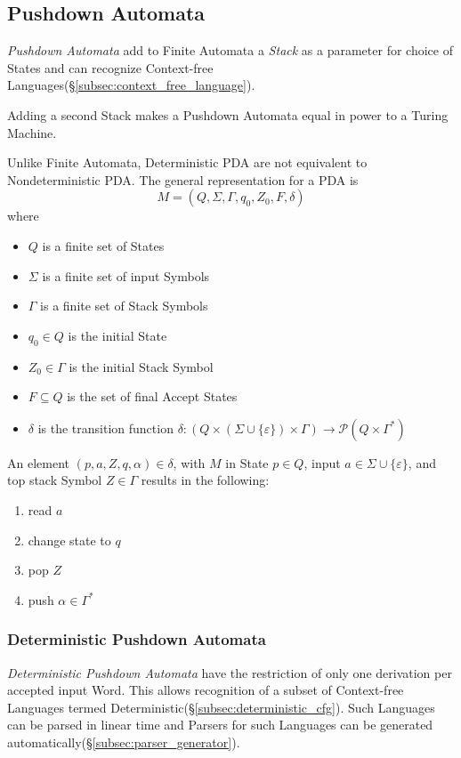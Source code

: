 \documentclass{article}
\begin{document}
\subsection{Pushdown Automata}\label{subsec:pushdown_automata}

\emph{Pushdown Automata} add to Finite Automata a \emph{Stack} as a
parameter for choice of States and can recognize Context-free
Languages(\S\ref{subsec:context_free_language}).

Adding a second Stack makes a Pushdown Automata equal in power to a
Turing Machine.

Unlike Finite Automata, Deterministic PDA are not equivalent to
Nondeterministic PDA. The general representation for a PDA is
\[
    M = (Q, \Sigma, \Gamma, q_0, Z_0, F, \delta)
\]
where
\begin{itemize}
\item $Q$ is a finite set of States
\item $\Sigma$ is a finite set of input Symbols
\item $\Gamma$ is a finite set of Stack Symbols
\item $q_0 \in Q$ is the initial State
\item $Z_0 \in \Gamma$ is the initial Stack Symbol
\item $F \subseteq Q$ is the set of final Accept States
\item $\delta$ is the transition function $\delta: (Q \times (\Sigma
  \cup \{\varepsilon\}) \times \Gamma) \rightarrow \mathcal{P}(Q \times
  \Gamma^*)$
\end{itemize}

An element $(p,a,Z,q,\alpha)\in\delta$, with $M$ in State $p \in Q$,
input $a \in \Sigma \cup \{\varepsilon\}$, and top stack Symbol $Z \in
\Gamma$ results in the following:
\begin{enumerate}
\item read $a$
\item change state to $q$
\item pop $Z$
\item push $\alpha \in \Gamma^*$
\end{enumerate}

\subsubsection{Deterministic Pushdown Automata}\label{subsec:deterministic_pda}
\emph{Deterministic Pushdown Automata} have the restriction of only
one derivation per accepted input Word. This allows recognition of a
subset of Context-free Languages termed
Deterministic(\S\ref{subsec:deterministic_cfg}). Such Languages can be
parsed in linear time and Parsers for such Languages can be generated
automatically(\S\ref{subsec:parser_generator}).
\end{document}
